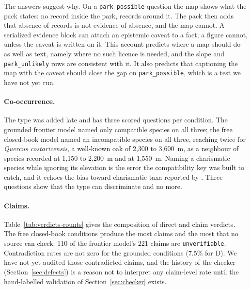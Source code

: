 \documentclass[11pt,a4paper]{article}
\newenvironment{prelim}{\par}{\par}
\newcommand{\vt}[1]{\texttt{#1}}          %
\begin{document}
\begin{prelim}
The answers suggest why. On a \vt{park\_possible} question the map shows what the
pack states: no record inside the park, records around it. The pack then adds that
absence of records is not evidence of absence, and the map cannot. A serialized
evidence block can attach an epistemic caveat to a fact; a figure cannot, unless the
caveat is written on it. This account predicts where a map should do as well as
text, namely where no such licence is needed, and the slope and \vt{park\_unlikely}
rows are consistent with it. It also predicts that captioning the map with the caveat
should close the gap on \vt{park\_possible}, which is a test we have not yet run.

\paragraph{Co-occurrence.} The type was added late and has three scored questions
per condition. The grounded frontier model named only compatible species on all
three; the free closed-book model named an incompatible species on all three,
reaching twice for \emph{Quercus costaricensis}, a well-known oak of 2{,}300 to
3{,}600~m, as a neighbour of species recorded at 1{,}150 to 2{,}200~m and at
1{,}550~m. Naming a charismatic species while ignoring its elevation is the error
the compatibility key was built to catch, and it echoes the bias toward charismatic
taxa reported by \citet{uryu2025iucn}. Three questions show that the type can
discriminate and no more.

\paragraph{Claims.} Table~\ref{tab:verdicts-counts} gives the composition of direct
and claim verdicts. The free closed-book conditions produce the most claims and the
most that no source can check: 110 of the frontier model's 221 claims are
\vt{unverifiable}. Contradiction rates are not zero for the grounded conditions
(7.5\% for D). We have not yet audited those contradicted claims, and the history of
the checker (Section~\ref{sec:defects}) is a reason not to interpret any claim-level
rate until the hand-labelled validation of Section~\ref{sec:checker} exists.

\begin{table}[htbp]
\centering
\caption{Composition of direct verdicts (one per answer) and claim verdicts (one per
claim) in the \RunLabel.}
\label{tab:verdicts-counts}
\small

\resizebox{\textwidth}{!}{}
\end{table}


\end{prelim}
\end{document}
